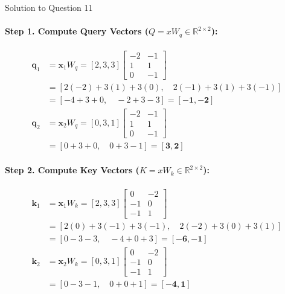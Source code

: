 \documentclass[11pt,a4paper]{article}
\begin{document}
\begin{solutionbox}{Solution to Question 11}
\paragraph{Step 1. Compute Query Vectors ($Q = x W_q \in \mathbb{R}^{2 \times 2}$):}
\begin{align*}
\mathbf{q}_1 &= \mathbf{x}_1 W_q = [2, 3, 3] \begin{bmatrix} -2 & -1 \\ 1 & 1 \\ 0 & -1 \end{bmatrix} \\
&= [2(-2) + 3(1) + 3(0), \quad 2(-1) + 3(1) + 3(-1)] \\
&= [-4 + 3 + 0, \quad -2 + 3 - 3] = \mathbf{[-1, -2]} \\[0.2cm]
\mathbf{q}_2 &= \mathbf{x}_2 W_q = [0, 3, 1] \begin{bmatrix} -2 & -1 \\ 1 & 1 \\ 0 & -1 \end{bmatrix} \\
&= [0 + 3 + 0, \quad 0 + 3 - 1] = \mathbf{[3, 2]}
\end{align*}

\paragraph{Step 2. Compute Key Vectors ($K = x W_k \in \mathbb{R}^{2 \times 2}$):}
\begin{align*}
\mathbf{k}_1 &= \mathbf{x}_1 W_k = [2, 3, 3] \begin{bmatrix} 0 & -2 \\ -1 & 0 \\ -1 & 1 \end{bmatrix} \\
&= [2(0) + 3(-1) + 3(-1), \quad 2(-2) + 3(0) + 3(1)] \\
&= [0 - 3 - 3, \quad -4 + 0 + 3] = \mathbf{[-6, -1]} \\[0.2cm]
\mathbf{k}_2 &= \mathbf{x}_2 W_k = [0, 3, 1] \begin{bmatrix} 0 & -2 \\ -1 & 0 \\ -1 & 1 \end{bmatrix} \\
&= [0 - 3 - 1, \quad 0 + 0 + 1] = \mathbf{[-4, 1]}
\end{align*}


\end{solutionbox}
\end{document}
